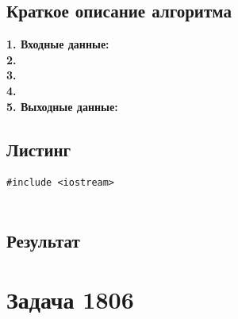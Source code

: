 \documentclass[a5paper, 10pt]{article}
\theoremstyle{definition}
\theoremstyle{plain}
\theoremstyle{remark}
\begin{document}
\subsection{Краткое описание алгоритма}
\textbf{1. Входные данные:} \\
\textbf{2.}  \\
\textbf{3.}  \\
\textbf{4.}  \\
\textbf{5. Выходные данные:} 

\subsection{Листинг}

\begin{center}
\begin{lstlisting}[label=some-code,caption={Исходный код для 1450}]
#include <iostream>


\end{lstlisting}
\end{center}

\subsection{Результат}









\newpage

\section{Задача 1806}
\end{document}
